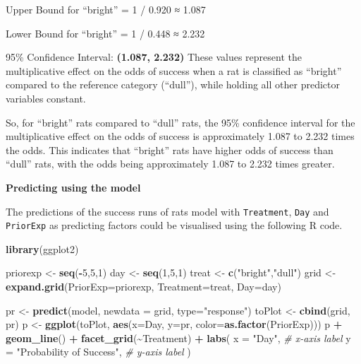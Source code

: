 \documentclass[
]{article}
\newenvironment{Shaded}{\begin{snugshade}}{\end{snugshade}}
\newcommand{\AttributeTok}[1]{\textcolor[rgb]{0.13,0.29,0.53}{#1}}
\newcommand{\CommentTok}[1]{\textcolor[rgb]{0.56,0.35,0.01}{\textit{#1}}}
\newcommand{\DecValTok}[1]{\textcolor[rgb]{0.00,0.00,0.81}{#1}}
\newcommand{\FunctionTok}[1]{\textcolor[rgb]{0.13,0.29,0.53}{\textbf{#1}}}
\newcommand{\NormalTok}[1]{#1}
\newcommand{\OtherTok}[1]{\textcolor[rgb]{0.56,0.35,0.01}{#1}}
\newcommand{\SpecialCharTok}[1]{\textcolor[rgb]{0.81,0.36,0.00}{\textbf{#1}}}
\newcommand{\StringTok}[1]{\textcolor[rgb]{0.31,0.60,0.02}{#1}}
\begin{document}
Upper Bound for ``bright'' = 1 / 0.920 ≈ 1.087

Lower Bound for ``bright'' = 1 / 0.448 ≈ 2.232

95\% Confidence Interval: \textbf{(1.087, 2.232)} These values represent
the multiplicative effect on the odds of success when a rat is
classified as ``bright'' compared to the reference category (``dull''),
while holding all other predictor variables constant.

So, for ``bright'' rats compared to ``dull'' rats, the 95\% confidence
interval for the multiplicative effect on the odds of success is
approximately 1.087 to 2.232 times the odds. This indicates that
``bright'' rats have higher odds of success than ``dull'' rats, with the
odds being approximately 1.087 to 2.232 times greater.

\textbf{Predicting using the model}

The predictions of the success runs of rats model with
\texttt{Treatment}, \texttt{Day} and \texttt{PriorExp} as predicting
factors could be visualised using the following R code.

\begin{Shaded}
\begin{Highlighting}[]
\FunctionTok{library}\NormalTok{(ggplot2)}

\NormalTok{priorexp }\OtherTok{\textless{}{-}} \FunctionTok{seq}\NormalTok{(}\SpecialCharTok{{-}}\DecValTok{5}\NormalTok{,}\DecValTok{5}\NormalTok{,}\DecValTok{1}\NormalTok{)}
\NormalTok{day }\OtherTok{\textless{}{-}} \FunctionTok{seq}\NormalTok{(}\DecValTok{1}\NormalTok{,}\DecValTok{5}\NormalTok{,}\DecValTok{1}\NormalTok{)}
\NormalTok{treat }\OtherTok{\textless{}{-}} \FunctionTok{c}\NormalTok{(}\StringTok{"bright"}\NormalTok{,}\StringTok{"dull"}\NormalTok{)}
\NormalTok{grid }\OtherTok{\textless{}{-}} \FunctionTok{expand.grid}\NormalTok{(}\AttributeTok{PriorExp=}\NormalTok{priorexp, }\AttributeTok{Treatment=}\NormalTok{treat, }\AttributeTok{Day=}\NormalTok{day)}

\NormalTok{pr }\OtherTok{\textless{}{-}} \FunctionTok{predict}\NormalTok{(model, }\AttributeTok{newdata =}\NormalTok{ grid, }\AttributeTok{type=}\StringTok{"response"}\NormalTok{)}
\NormalTok{toPlot }\OtherTok{\textless{}{-}} \FunctionTok{cbind}\NormalTok{(grid, pr)}
\NormalTok{p }\OtherTok{\textless{}{-}} \FunctionTok{ggplot}\NormalTok{(toPlot, }\FunctionTok{aes}\NormalTok{(}\AttributeTok{x=}\NormalTok{Day, }\AttributeTok{y=}\NormalTok{pr, }\AttributeTok{color=}\FunctionTok{as.factor}\NormalTok{(PriorExp)))}
\NormalTok{p }\SpecialCharTok{+} \FunctionTok{geom\_line}\NormalTok{() }\SpecialCharTok{+} \FunctionTok{facet\_grid}\NormalTok{(}\SpecialCharTok{\textasciitilde{}}\NormalTok{Treatment) }\SpecialCharTok{+}  \FunctionTok{labs}\NormalTok{(}
  \AttributeTok{x =} \StringTok{"Day"}\NormalTok{,                   }\CommentTok{\# x{-}axis label}
  \AttributeTok{y =} \StringTok{"Probability of Success"}\NormalTok{,    }\CommentTok{\# y{-}axis label}
\NormalTok{)}
\end{Highlighting}
\end{Shaded}
\end{document}
